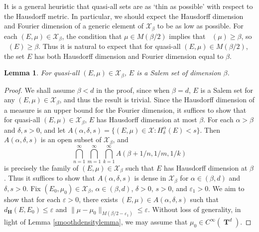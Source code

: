 \documentclass[12pt,reqno]{article}
\numberwithin{equation}{section}
\DeclareMathOperator{\hausdim}{\dim_{\mathbf{H}}}
\DeclareMathOperator{\fordim}{\dim_{\mathbf{F}}}
\DeclareMathOperator{\TT}{\mathbf{T}}
\newtheorem{lemma}[theorem]{Lemma}
\numberwithin{theorem}{section}
\begin{document}
It is a general heuristic that quasi-all sets are as `thin as possible' with respect to the Hausdorff metric. In particular, we should expect the Hausdorff dimension and Fourier dimension of a generic element of $\mathcal{X}_\beta$ to be as low as possible. For each $(E,\mu) \in \mathcal{X}_\beta$, the condition that $\mu \in M(\beta/2)$ implies that $\fordim(\mu) \geq \beta$, so $\fordim(E) \geq \beta$. Thus it is natural to expect that for quasi-all $(E,\mu) \in M(\beta/2)$, the set $E$ has both Hausdorff dimension and Fourier dimension equal to $\beta$.

\begin{lemma}
    For quasi-all $(E,\mu) \in \mathcal{X}_\beta$, $E$ is a Salem set of dimension $\beta$.
\end{lemma}
\begin{proof}
    We shall assume $\beta < d$ in the proof, since when $\beta = d$, $E$ is a Salem set for any $(E,\mu) \in \mathcal{X}_\beta$, and thus the result is trivial. Since the Hausdorff dimension of a measure is an upper bound for the Fourier dimension, it suffices to show that for quasi-all $(E,\mu) \in \mathcal{X}_\beta$, $E$ has Hausdorff dimension at most $\beta$. For each $\alpha > \beta$ and $\delta, s > 0$, and let $A(\alpha,\delta,s) = \{ (E,\mu) \in \mathcal{X}: H^\alpha_\delta(E) < s \}$. Then $A(\alpha,\delta,s)$ is an open subset of $\mathcal{X}_\beta$, and
    \[ \bigcap_{n = 1}^\infty \bigcap_{m = 1}^\infty \bigcap_{k = 1}^\infty A(\beta + 1/n, 1/m, 1/k) \]
    is precisely the family of $(E,\mu) \in \mathcal{X}_\beta$ such that $E$ has Hausdorff dimension at $\beta$.
%
    Thus it suffices to show that $A(\alpha,\delta,s)$ is dense in $\mathcal{X}_\beta$ for $\alpha \in (\beta,d)$ and $\delta, s > 0$. Fix $(E_0,\mu_0) \in \mathcal{X}_\beta$, $\alpha \in (\beta,d)$, $\delta > 0$, $s > 0$, and $\varepsilon_1 > 0$. We aim to show that for each $\varepsilon > 0$, there exists $(E,\mu) \in A(\alpha,\delta,s)$ such that $d_\mathbf{H}(E,E_0) \leq \varepsilon$ and $\| \mu - \mu_0 \|_{M(\beta/2 - \varepsilon_1)} \leq \varepsilon$. Without loss of generality, in light of Lemma \ref{smoothdensitylemma}, we may assume that $\mu_0 \in C^\infty(\TT^d)$.


\end{proof}
\end{document}
